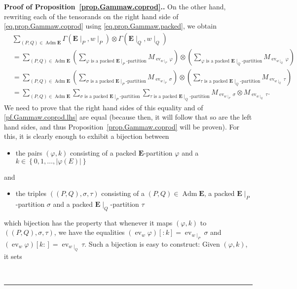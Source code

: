 \documentclass[numbers=enddot,12pt,final,onecolumn,notitlepage,abstracton]{scrartcl}%
\theoremstyle{definition}
\newenvironment{proof}[1][Proof]{\noindent\textbf{#1.} }{\ \rule{0.5em}{0.5em}}
\let\sumnonlimits\sum
\renewcommand{\sum}{\sumnonlimits\limits}
\newcommand{\ev}{\operatorname{ev}}
\newcommand{\Adm}{\operatorname{Adm}}
\newcommand{\EE}{{\mathbf{E}}}
\begin{document}
\begin{proof}[Proof of Proposition~\ref{prop.Gammaw.coprod}.]
On the other hand, rewriting each of the tensorands on the right
hand side of \eqref{eq.prop.Gammaw.coprod} using
\eqref{eq.prop.Gammaw.packed}, we obtain
\begin{align*}
& \sum_{\left(P, Q\right) \in \Adm \EE}
\Gamma\left(\EE\mid_P, w\mid_P\right)
\otimes \Gamma\left(\EE\mid_Q, w\mid_Q\right) \\
&= \sum_{\left(P, Q\right) \in \Adm \EE}
\left(\sum_{\varphi \text{ is a packed } \EE\mid_P\text{-partition}}
M_{\ev_{w\mid_P} \varphi}\right)
\otimes
\left(\sum_{\varphi \text{ is a packed } \EE\mid_Q\text{-partition}}
M_{\ev_{w\mid_Q} \varphi}\right) \\
& = \sum_{\left(P, Q\right) \in \Adm \EE}
\left(\sum_{\sigma \text{ is a packed } \EE\mid_P\text{-partition}}
M_{\ev_{w\mid_P} \sigma}\right)
\otimes
\left(\sum_{\tau \text{ is a packed } \EE\mid_Q\text{-partition}}
M_{\ev_{w\mid_Q} \tau}\right) \\
& = \sum_{\left(P, Q\right) \in \Adm \EE}
\sum_{\sigma \text{ is a packed } \EE\mid_P\text{-partition}}
\sum_{\tau \text{ is a packed } \EE\mid_Q\text{-partition}}
M_{\ev_{w\mid_P} \sigma}
\otimes
M_{\ev_{w\mid_Q} \tau} .
\end{align*}
We need to prove that the right hand sides of this equality and of
\eqref{pf.Gammaw.coprod.lhs} are equal (because then, it will follow
that so are the left hand sides, and thus
Proposition~\ref{prop.Gammaw.coprod} will be proven). For this, it
is clearly enough to exhibit a bijection between
\begin{itemize}
\item the pairs
$\left(\varphi, k\right)$ consisting of a packed $\EE$-partition
$\varphi$ and a
$k \in \left\{0, 1, \ldots, \left|\varphi\left(E\right)\right|
\right\}$
\end{itemize}
and
\begin{itemize}
\item the triples $\left(\left(P, Q\right), \sigma, \tau
\right)$ consisting of a $\left(P, Q\right) \in \Adm \EE$, a packed
$\EE\mid_P$-partition $\sigma$ and a packed $\EE\mid_Q$-partition
$\tau$
\end{itemize}
which bijection has the property that
whenever it maps $\left(\varphi, k\right)$ to
$\left(\left(P, Q\right), \sigma, \tau\right)$,
we have the equalities
$\left(\ev_w \varphi\right)\left[:k\right]
= \ev_{w\mid_P}\sigma$
and
$\left(\ev_w \varphi\right)\left[k:\right]
= \ev_{w\mid_Q}\tau$.
Such a bijection is easy to construct: Given
$\left(\varphi, k\right)$, it sets

\end{proof}
\end{document}
